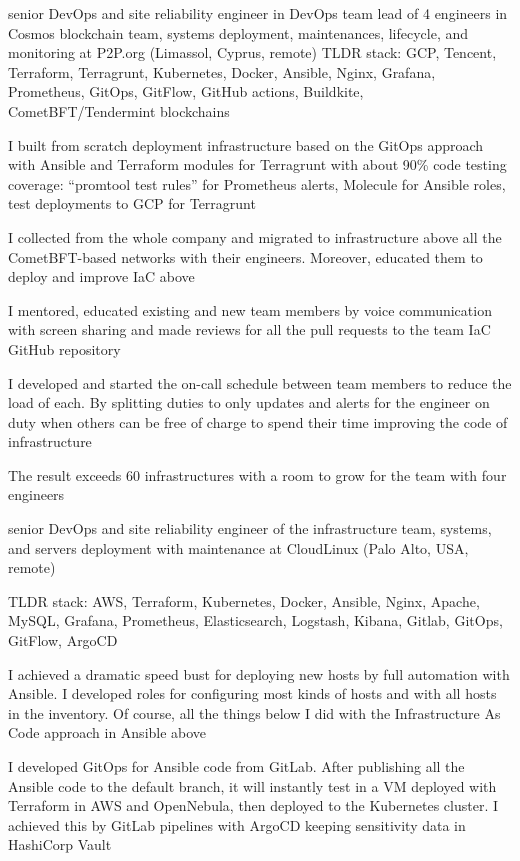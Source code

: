 {\begin{list}{●}
{            senior DevOps and site reliability engineer in
          }{%
            DevOps team lead of 4 engineers in
          }%
          Cosmos blockchain team, systems deployment, maintenances, lifecycle, and monitoring at P2P.org (Limassol, Cyprus, remote)
          \PositonHead
          TLDR stack: GCP, Tencent, Terraform, Terragrunt, Kubernetes, Docker, Ansible, Nginx, Grafana, Prometheus, GitOps, GitFlow, GitHub actions, Buildkite, CometBFT/Tendermint blockchains
    \item I built from scratch deployment infrastructure based on the GitOps approach with Ansible and Terraform modules for Terragrunt with about 90\% code testing coverage: “promtool test rules” for Prometheus alerts, Molecule for Ansible roles, test deployments to GCP for Terragrunt
    \item I collected from the whole company and migrated to infrastructure above all the CometBFT-based networks with their engineers. Moreover, educated them to deploy and improve IaC above
    \item I mentored, educated existing and new team members by voice communication with screen sharing and made reviews for all the pull requests to the team IaC GitHub repository
    \item I developed and started the on-call schedule between team members to reduce the load of each. By splitting duties to only updates and alerts for the engineer on duty when others can be free of charge to spend their time improving the code of infrastructure
    \item The result exceeds 60 infrastructures with a room to grow for the team with four engineers
  \end{list}
  \item {}senior DevOps and site reliability engineer of the infrastructure team, systems, and servers deployment with maintenance at CloudLinux (Palo Alto, USA, remote)
  \PositonHead
  \item TLDR stack: AWS, Terraform, Kubernetes, Docker, Ansible, Nginx, Apache, MySQL, Grafana, Prometheus, Elasticsearch, Logstash, Kibana, Gitlab, GitOps, GitFlow, ArgoCD
  \item I achieved a dramatic speed bust for deploying new hosts by full automation with Ansible. I developed roles for configuring most kinds of hosts and with all hosts in the inventory. Of course, all the things below I did with the Infrastructure As Code approach in Ansible above
  \item I developed GitOps for Ansible code from GitLab. After publishing all the Ansible code to the default branch, it will instantly test in a VM deployed with Terraform in AWS and OpenNebula, then deployed to the Kubernetes cluster. I achieved this by GitLab pipelines with ArgoCD keeping sensitivity data in HashiCorp Vault
}

